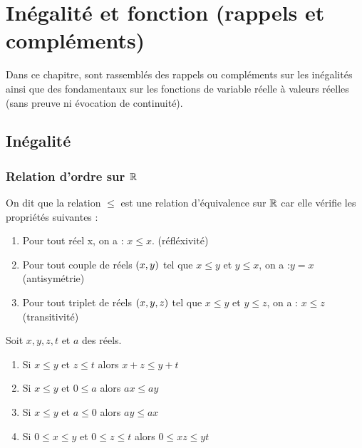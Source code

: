 \chapter{Inégalité et fonction (rappels et compléments)}

\minitoc

Dans ce chapitre, sont rassemblés des rappels ou compléments sur les inégalités ainsi que des fondamentaux sur les fonctions de variable réelle à valeurs réelles (sans preuve ni évocation de continuité).

\section{Inégalité}

\subsection{Relation d'ordre sur \(\mathbb{R}\)}

\begin{defi}
	On dit que la relation \(\leq\) est une relation d'équivalence sur \(\mathbb{R}\) car elle vérifie les propriétés suivantes :
	\begin{enumerate}
		\item Pour tout réel x, on a : \(x \leq x \). \hfill (réfléxivité)
		\item Pour tout couple de réels \(\left(x,y\right)\) tel que \( x \leq y  \) et \(y \leq x\), on a :\( y = x  \) \hfill (antisymétrie)
		\item Pour tout triplet de réels \(\left(x,y,z\right)\) tel que \(x \leq y  \) et \( y \leq z  \), on a : \( x \leq z  \) \hfill (transitivité)
	\end{enumerate}
\end{defi}

\begin{prop}
	Soit \(x,y,z,t\) et \(a\) des réels.
	\begin{enumerate}
		\item Si \(x\leq y\) et \(z\leq t\) alors \(x+z\leq y +t \)
		\item Si \(x\leq y \) et \( 0 \leq a\) alors \(a x \leq a y\)
		\item Si \(x\leq y \) et \( a \leq 0\) alors \(a y \leq a x\)
		\item Si \( 0 \leq x \leq y \) et \( 0\leq z \leq t \) alors \( 0 \leq xz \leq y t \)
	\end{enumerate}
\end{prop}

